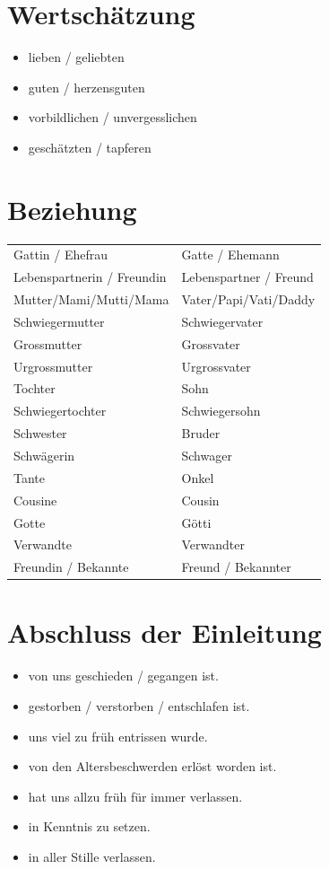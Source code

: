 \documentclass[ngerman,a4paper,11pt]{scrreprt}
\begin{document}
\section{Wertschätzung}
\label{sec-1-1-3}

\begin{itemize}
\item lieben / geliebten
\item guten / herzensguten
\item vorbildlichen / unvergesslichen
\item geschätzten / tapferen
\end{itemize}

\section{Beziehung}
\label{sec-1-1-4}

\begin{center}
\begin{tabular}{ll}
Gattin / Ehefrau & Gatte / Ehemann\\
Lebenspartnerin / Freundin & Lebenspartner / Freund\\
Mutter/Mami/Mutti/Mama & Vater/Papi/Vati/Daddy\\
Schwiegermutter & Schwiegervater\\
Grossmutter & Grossvater\\
Urgrossmutter & Urgrossvater\\
Tochter & Sohn\\
Schwiegertochter & Schwiegersohn\\
Schwester & Bruder\\
Schwägerin & Schwager\\
Tante & Onkel\\
Cousine & Cousin\\
Gotte & Götti\\
Verwandte & Verwandter\\
Freundin / Bekannte & Freund / Bekannter\\
\end{tabular}
\end{center}

\section{Abschluss der Einleitung}
\label{sec-1-1-5}

\begin{itemize}
\item von uns geschieden / gegangen ist.
\item gestorben / verstorben / entschlafen ist.
\item uns viel zu früh entrissen wurde.
\item von den Altersbeschwerden erlöst worden ist.
\item hat uns allzu früh für immer verlassen.
\item in Kenntnis zu setzen.
\item in aller Stille verlassen.
\end{itemize}
\end{document}
